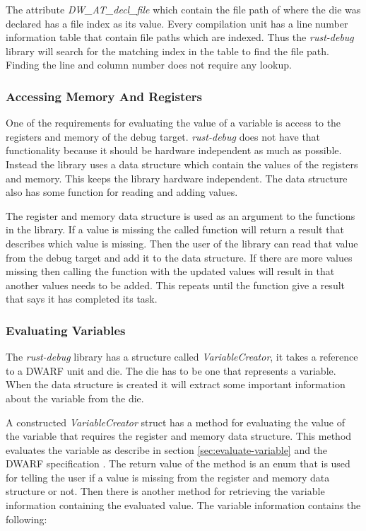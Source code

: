 The attribute  \emph{DW\_AT\_decl\_file} which contain the file path of where the \gls{die} was declared has a file index as its value.
Every compilation unit has a line number information table that contain file paths which are indexed.
Thus the \emph{rust-debug} library will search for the matching index in the table to find the file path.
Finding the line and column number does not require any lookup.


\subsubsection{Accessing Memory And Registers}
One of the requirements for evaluating the value of a variable is access to the registers and memory of the debug target.
\emph{rust-debug} does not have that functionality because it should be hardware independent as much as possible.
Instead the library uses a data structure which contain the values of the registers and memory.
This keeps the library hardware independent.
The data structure also has some function for reading and adding values.


The register and memory data structure is used as an argument to the functions in the library.
If a value is missing the called function will return a result that describes which value is missing.
Then the user of the library can read that value from the debug target and add it to the data structure.
If there are more values missing then calling the function with the updated values will result in that another values needs to be added.
This repeats until the function give a result that says it has completed its task.


\subsubsection{Evaluating Variables} \label{sec:ievalvar}
The \emph{rust-debug} library has a structure called \emph{VariableCreator}, it takes a reference to a \gls{DWARF} unit and \gls{die}.
The \gls{die} has to be one that represents a variable.
When the data structure is created it will extract some important information about the variable from the \gls{die}.


A constructed \emph{VariableCreator} struct has a method for evaluating the value of the variable that requires the register and memory data structure.
This method evaluates the variable as describe in section \ref{sec:evaluate-variable} and the \gls{DWARF} specification \cite{dwarf}.
The return value of the method is an enum that is used for telling the user if a value is missing from the register and memory data structure or not.
Then there is another method for retrieving the variable information containing the evaluated value.
The variable information contains the following:


